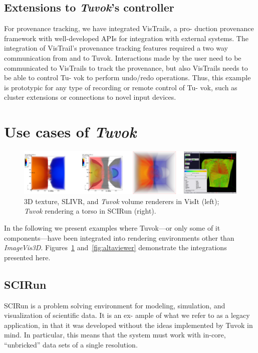 \subsection{Extensions to \textit{Tuvok}'s controller}

For provenance tracking, we have integrated VisTrails, a pro-
duction provenance framework with well-developed APIs
for integration with external systems. The integration of
VisTrail’s provenance tracking features required a two way
communication from and to Tuvok. Interactions made by
the user need to be communicated to VisTrails to track the
provenance, but also VisTrails needs to be able to control Tu-
vok to perform undo/redo operations. Thus, this example is
prototypic for any type of recording or remote control of Tu-
vok, such as cluster extensions or connections to novel input
devices.

\section{Use cases of \textit{Tuvok}}

\begin{figure}
	\includegraphics[width=\linewidth]{images/arch/integration}

  \caption{3D texture, SLIVR, and \textit{Tuvok} volume renderers in
  VisIt (left); \textit{Tuvok} rendering a torso in SCIRun (right).}
	\label{fig:integration}
\end{figure}

In the following we present examples where Tuvok---or only some of it
components---have been integrated into rendering environments other
than
\textit{ImageVis3D}. Figures~\ref{fig:integration}
and~\ref{fig:altaviewer} demonstrate the integrations presented here.

\subsection{SCIRun}

SCIRun is a problem solving environment for modeling,
simulation, and visualization of scientific data. It is an ex-
ample of what we refer to as a legacy application, in that it
was developed without the ideas implemented by Tuvok in
mind. In particular, this means that the system must work
with in-core, “unbricked” data sets of a single resolution.

